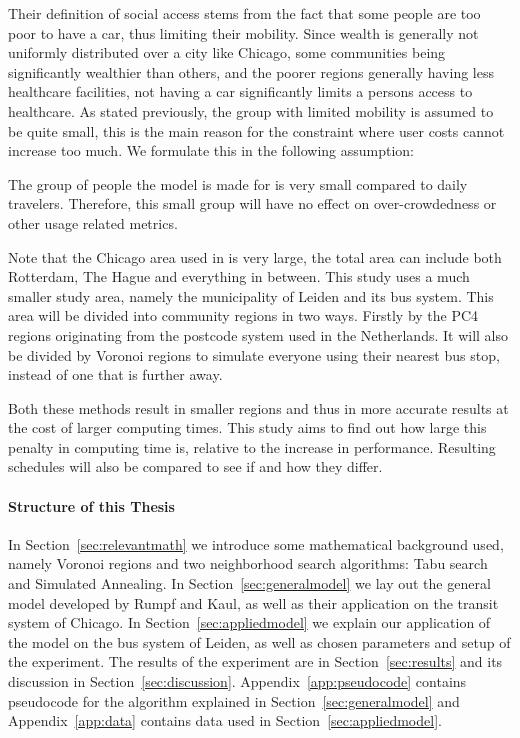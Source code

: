 Their definition of social access stems from the fact that some people are too poor to have a car, thus limiting their mobility. Since wealth is generally not uniformly distributed over a city like Chicago, some communities being significantly wealthier than others, and the poorer regions generally having less healthcare facilities, not having a car significantly limits a persons access to healthcare. As stated previously, the group with limited mobility is assumed to be quite small, this is the main reason for the constraint where user costs cannot increase too much. We formulate this in the following assumption:

\begin{assumption}\label{assum:smallgroup}
    The group of people the model is made for is very small compared to daily travelers. Therefore, this small group will have no effect on over-crowdedness or other usage related metrics.
\end{assumption}

Note that the Chicago area used in \cite{rumpf} is very large, the total area can include both Rotterdam, The Hague and everything in between. This study uses a much smaller study area, namely the municipality of Leiden and its bus system. This area will be divided into community regions in two ways. Firstly by the PC4 regions originating from the postcode system used in the Netherlands. It will also be divided by Voronoi regions to simulate everyone using their nearest bus stop, instead of one that is further away.

Both these methods result in smaller regions and thus in more accurate results at the cost of larger computing times. This study aims to find out how large this penalty in computing time is, relative to the increase in performance. Resulting schedules will also be compared to see if and how they differ.

\paragraph{Structure of this Thesis}
In Section~\ref{sec:relevantmath} we introduce some mathematical background used, namely Voronoi regions and two neighborhood search algorithms: Tabu search and Simulated Annealing. In Section~\ref{sec:generalmodel} we lay out the general model developed by Rumpf and Kaul, as well as their application on the transit system of Chicago. In Section~\ref{sec:appliedmodel} we explain our application of the model on the bus system of Leiden, as well as chosen parameters and setup of the experiment. The results of the experiment are in Section~\ref{sec:results} and its discussion in Section~\ref{sec:discussion}. Appendix~\ref{app:pseudocode} contains pseudocode for the algorithm explained in Section~\ref{sec:generalmodel} and Appendix~\ref{app:data} contains data used in Section~\ref{sec:appliedmodel}.
